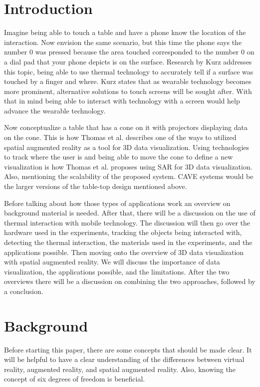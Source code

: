 \documentclass{sig-alternate}
\begin{document}
\section{Introduction}
\label{sec:Introduction}
Imagine being able to touch a table and have a phone know the location of the interaction. Now envision the same scenario, but this time the phone says the number 0 was pressed because the area touched corresponded to the number 0 on a dial pad that your phone depicts is on the surface. Research by Kurz \cite{Thermal} addresses this topic, being able to use thermal technology to accurately tell if a surface was touched by a finger and where. Kurz \cite{Thermal} states that as wearable technology becomes more prominent, alternative solutions to touch screens will be sought after. With that in mind being able to interact with technology with a screen would help advance the wearable technology.    

Now conceptualize a table that has a cone on it with projectors displaying data on the cone. This is how Thomas et al. describes one of the ways to utilized spatial augmented reality as a tool for 3D data visualization. Using technologies to track where the user is and being able to move the cone to define a new visualization is how Thomas et al. \cite{3D} proposes using SAR for 3D data visualization. Also, mentioning the scalability of the proposed system. CAVE systems would be the larger versions of the table-top design mentioned above.      

Before talking about how those types of applications work an overview on background material is needed. After that, there will be a discussion on the use of thermal interaction with mobile technology. The discussion will then go over the hardware used in the experiments, tracking the objects being interacted with, detecting the thermal interaction, the materials used in the experiments, and the applications possible. Then moving onto the overview of 3D data visualization with spatial augmented reality. We will  discuss the importance of data visualization, the applications possible, and the limitations. After the two overviews there will be a discussion on combining the two approaches, followed by a conclusion.       


\section{Background}
\label{sec:background} 
Before starting this paper, there are some concepts that should be made clear. It will be helpful to have a clear understanding of the differences between virtual reality, augmented reality, and spatial augmented reality. Also, knowing the concept of six degrees of freedom is beneficial.  
\end{document}
